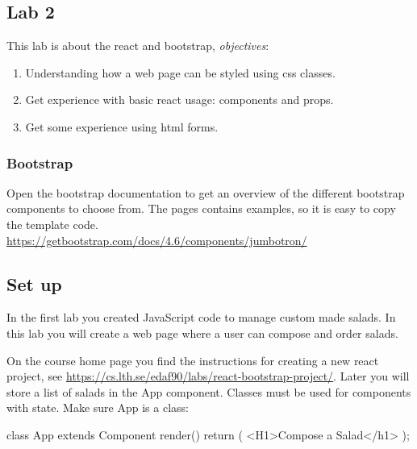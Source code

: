 \documentclass[fleqn, article, a4paper]{memoir}
\begin{document}
\maketitle
\thispagestyle{titlepage}
\vspace{-4cm}

\subsection*{Lab 2}

\n This lab is about the react and bootstrap, \emph{objectives}:

\begin{enumerate}\firmlist
\item Understanding how a web page can be styled using css classes.
\item Get experience with basic react usage: components and props.
\item Get some experience using html forms.
\end{enumerate}

\subsubsection*{Bootstrap}
Open the bootstrap documentation to get an overview of the different bootstrap components to choose from. The pages contains examples, so it is easy to copy the template code.
\\ \url{https://getbootstrap.com/docs/4.6/components/jumbotron/}

\subsection*{Set up}

In the first lab you created JavaScript code to manage custom made salads. In this lab you will create a web page where a user can compose and order salads.

On the course home page you find the instructions for creating a new react project, see \url{https://cs.lth.se/edaf90/labs/react-bootstrap-project/}. Later you will store a list of salads in the App component. Classes must be used for components with state. Make sure App is a class:
\begin{Code}
class App extends Component {
  render() {
    return (
      <H1>Compose a Salad</h1>
    );
  }
}

\end{Code}
\end{document}
